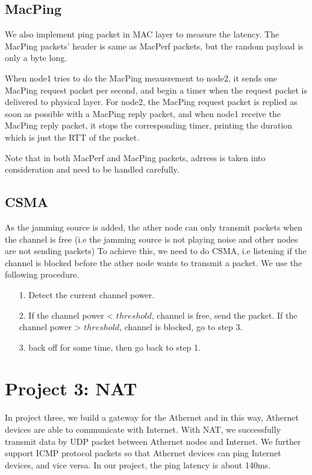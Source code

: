 \documentclass[11pt, conference]{IEEEtran}
\begin{document}
\subsection{MacPing}

We also implement ping packet in MAC layer to measure the latency. The MacPing packets' header is same as MacPerf packets, but the random payload is only a byte long.

When node1 tries to do the MacPing meausrement to node2, it sends one MacPing request packet per second, and begin a timer when the request packet is delivered to physical layer. For node2, the MacPing request packet is replied
as soon as possible with a MacPing reply packet, and when node1 receive the MacPing reply packet, it stops the corresponding timer, printing the duration which is just the RTT of the packet.

Note that in both MacPerf and MacPing packets, adrress is taken into consideration and need to be handled carefully.

\subsection{{CSMA}}
As the jamming source is added, the ather node can only transmit packets when the channel is free (i.e the jamming source is not playing noise and other nodes are not sending packets)
To achieve this, we need to do CSMA, i.e listening if the channel is blocked before the ather node wants to transmit a packet. We use the following procedure.
\begin{itemize}
    \item[1.] Detect the current channel power.
    \item[2.] If the channel power < $threshold$, channel is free, send the packet. If the channel power > $threshold$, channel is blocked, go to step 3. 
    \item[3.] back off for some time, then go back to step 1.
\end{itemize}

\section{Project 3: NAT}

In project three, we build a gateway for the Athernet and in this way, Athernet devices are able to communicate with Internet. With NAT, we successfully transmit data by UDP packet between Athernet nodes and Internet. 
We further support ICMP protocol packets so that Athernet devices can ping Internet devices, and vice versa. In our project, the ping latency is about 140ms.
\end{document}
